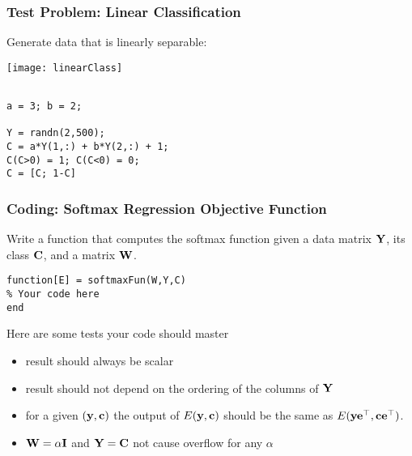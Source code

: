 \documentclass[12pt,fleqn,handout]{beamer}
\begin{document}
\begin{frame}[fragile]\frametitle{Test Problem: Linear Classification}

Generate data that is linearly separable:

\begin{center}
	\texttt{[image: linearClass]}
\end{center}
\vspace*{-5mm}
\begin{verbatim}

a = 3; b = 2;

Y = randn(2,500);
C = a*Y(1,:) + b*Y(2,:) + 1;
C(C>0) = 1; C(C<0) = 0;
C = [C; 1-C]

\end{verbatim}


\end{frame}


\begin{frame}[fragile]\frametitle{Coding: Softmax Regression Objective Function}


Write a function that computes the softmax function given a data matrix ${\bf Y}$,
its class ${\bf C}$, and a matrix ${\bf W}$.

\bigskip

\begin{verbatim}
function[E] = softmaxFun(W,Y,C)
% Your code here
end
\end{verbatim}
Here are some tests your code should master
\begin{itemize}
	\item result should always be scalar
	\item result should not depend on the ordering of the columns of ${\bf Y}$
	\item for a given $({\bf y},{\bf c})$ the output of $E({\bf y},{\bf c})$ should be the same as $E({\bf y}{\bf e}^\top, {\bf c}{\bf e}^\top)$.
	\item ${\bf W} = \alpha {\bf I}$ and ${\bf Y} = {\bf C}$ not cause overflow for any $\alpha$
\end{itemize}
\end{frame}
\end{document}
